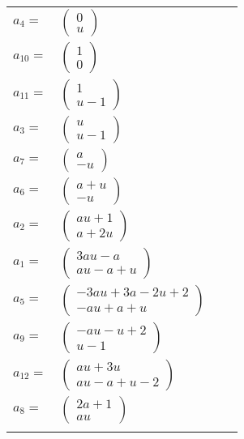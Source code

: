 \documentclass[1p]{elsarticle_modified}
\theoremstyle{definition}
\begin{document}
\begin{tabular}{m{7pt} m{180pt} m{7pt} m{180pt} }
\flushright $a_{4}=$&$\begin{pmatrix}0\\u\end{pmatrix}$ \\
\flushright $a_{10}=$&$\begin{pmatrix}1\\0\end{pmatrix}$ \\
\flushright $a_{11}=$&$\begin{pmatrix}1\\u-1\end{pmatrix}$ \\
\flushright $a_{3}=$&$\begin{pmatrix}u\\u-1\end{pmatrix}$ \\
\flushright $a_{7}=$&$\begin{pmatrix}a\\- u\end{pmatrix}$ \\
\flushright $a_{6}=$&$\begin{pmatrix}a+u\\- u\end{pmatrix}$ \\
\flushright $a_{2}=$&$\begin{pmatrix}a u+1\\a+2 u\end{pmatrix}$ \\
\flushright $a_{1}=$&$\begin{pmatrix}3 a u- a\\a u- a+u\end{pmatrix}$ \\
\flushright $a_{5}=$&$\begin{pmatrix}-3 a u+3 a-2 u+2\\- a u+a+u\end{pmatrix}$ \\
\flushright $a_{9}=$&$\begin{pmatrix}- a u- u+2\\u-1\end{pmatrix}$ \\
\flushright $a_{12}=$&$\begin{pmatrix}a u+3 u\\a u- a+u-2\end{pmatrix}$ \\
\flushright $a_{8}=$&$\begin{pmatrix}2 a+1\\a u\end{pmatrix}$\\&\end{tabular}
\end{document}

